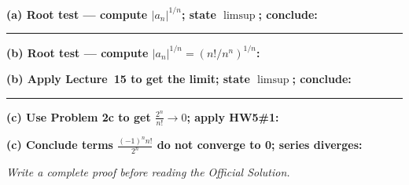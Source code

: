 \documentclass[12pt]{article}
\newcommand{\writespace}[1]{\vspace{#1}}
\begin{document}
\newpage

\begin{tcolorbox}[
  enhanced, breakable,
  colback  = pass4purple,
  colframe = purple!55!black,
  fonttitle = \bfseries,
  title = {Pass 4 \enspace\textbf{--}\enspace Skeleton Proof}
]
\noindent\textbf{(a) Root test — compute $|a_n|^{1/n}$; state $\limsup$; conclude:}\par
\writespace{1.6cm}

\noindent\rule{\linewidth}{0.4pt}\vspace{2pt}

\noindent\textbf{(b) Root test — compute $|a_n|^{1/n} = (n!/n^n)^{1/n}$:}\par
\writespace{1.2cm}
\noindent\textbf{(b) Apply Lecture~15 to get the limit; state $\limsup$; conclude:}\par
\writespace{1.2cm}

\noindent\rule{\linewidth}{0.4pt}\vspace{2pt}

\noindent\textbf{(c) Use Problem 2c to get $\frac{2^n}{n!} \to 0$; apply HW5\#1:}\par
\writespace{1.4cm}
\noindent\textbf{(c) Conclude terms $\frac{(-1)^n n!}{2^n}$ do not converge to 0; series diverges:}\par
\writespace{1.2cm}
\end{tcolorbox}

\newpage

\begin{tcolorbox}[
  enhanced, breakable,
  colback  = pass5gray,
  colframe = black!38,
  fonttitle = \bfseries,
  title = {Pass 5 \enspace\textbf{--}\enspace Full Proof Attempt}
]
\small\itshape Write a complete proof before reading the Official Solution.\par
\normalfont\normalsize
\writespace{19cm}
\end{tcolorbox}

\newpage
\end{document}
